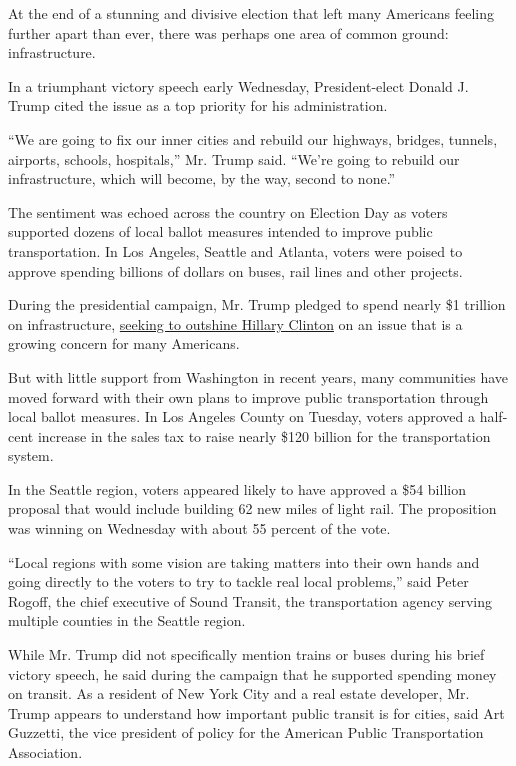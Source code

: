 At the end of a stunning and divisive election that left many Americans
feeling further apart than ever, there was perhaps one area of common
ground: infrastructure.

In a triumphant victory speech early Wednesday, President-elect Donald
J. Trump cited the issue as a top priority for his administration.

``We are going to fix our inner cities and rebuild our highways,
bridges, tunnels, airports, schools, hospitals,'' Mr. Trump said.
``We're going to rebuild our infrastructure, which will become, by the
way, second to none.''

The sentiment was echoed across the country on Election Day as voters
supported dozens of local ballot measures intended to improve public
transportation. In Los Angeles, Seattle and Atlanta, voters were poised
to approve spending billions of dollars on buses, rail lines and other
projects.

During the presidential campaign, Mr. Trump pledged to spend nearly \$1
trillion on infrastructure,
\href{http://www.nytimes.com/2016/08/03/us/politics/trump-clinton-infrastructure.html}{seeking
to outshine Hillary Clinton} on an issue that is a growing concern for
many Americans.

But with little support from Washington in recent years, many
communities have moved forward with their own plans to improve public
transportation through local ballot measures. In Los Angeles County on
Tuesday, voters approved a half-cent increase in the sales tax to raise
nearly \$120 billion for the transportation system.

In the Seattle region, voters appeared likely to have approved a \$54
billion proposal that would include building 62 new miles of light rail.
The proposition was winning on Wednesday with about 55 percent of the
vote.

``Local regions with some vision are taking matters into their own hands
and going directly to the voters to try to tackle real local problems,''
said Peter Rogoff, the chief executive of Sound Transit, the
transportation agency serving multiple counties in the Seattle region.

While Mr. Trump did not specifically mention trains or buses during his
brief victory speech, he said during the campaign that he supported
spending money on transit. As a resident of New York City and a real
estate developer, Mr. Trump appears to understand how important public
transit is for cities, said Art Guzzetti, the vice president of policy
for the American Public Transportation Association.

